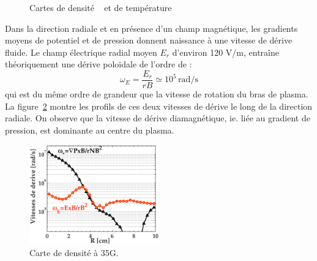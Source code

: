 \begin{refsection}
\begin{figure}[!htbp]
  \centering
    \caption{Cartes de densité ~ et de
    température }
    \label{4-CybeleCarteFlux}
\end{figure}

Dans la direction radiale et en présence d'un champ magnétique, les gradients
moyens de potentiel et de pression donnent naissance à une vitesse de dérive
fluide. Le champ électrique radial moyen $E_r$ d'environ 120 V/m, entraîne
théoriquement une dérive poloïdale de l'ordre de :
\begin{equation}
\omega_E=\frac{E_r}{rB}\simeq10^5\,\text{rad/s} 
\end{equation}
qui est du même ordre de grandeur que la vitesse de rotation du bras de plasma.
La figure~\ref{4-CybeleVitessesDerive} montre les profils de ces deux vitesses
de dérive le long de la direction radiale. On observe que la vitesse de dérive
diamagnétique, ie. liée au gradient de pression, est dominante au centre du
plasma. 

\begin{figure}[!htbp]
\centering
\includegraphics[width=0.5\textwidth]{figures/4-CybeleProfileVitessesDerive.eps}
{\caption{Carte de densité à 35G.}
\label{4-CybeleVitessesDerive}}
\end{figure}


\end{refsection}
